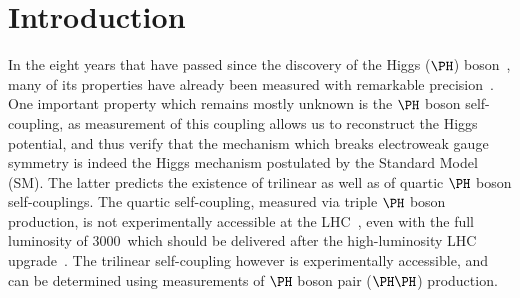 \section{Introduction}
\label{sec:introduction}

In the eight years that have passed since the discovery of the Higgs ($\PHiggs$) boson~\cite{Higgs-Discovery_CMS,Higgs-Discovery_CMS_long,Higgs-Discovery_ATLAS},
many of its properties have already been measured with remarkable precision~\cite{HIG-14-042,HIG-15-002,ATLAS_SpinCP,HIG-14-018,HIG-16-041}. %
One important property which remains mostly unknown is the $\PHiggs$ boson self-coupling, as measurement of this coupling allows us to reconstruct the Higgs potential,
and thus verify that the mechanism which breaks electroweak gauge symmetry is indeed the Higgs mechanism postulated by the Standard Model (SM).
The latter predicts the existence of trilinear as well as of quartic $\PHiggs$ boson self-couplings.
The quartic self-coupling, measured via triple $\PHiggs$ boson production, is not experimentally accessible at the LHC~\cite{de_Florian_2020},
even with the full luminosity of 3000~\fbinv which should be delivered after the high-luminosity LHC upgrade~\cite{HL-LHC-TDR}.
The trilinear self-coupling however is experimentally accessible, and can be determined using measurements of $\PHiggs$ boson pair ($\HH$) production.

